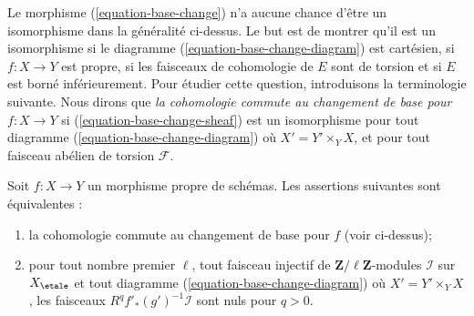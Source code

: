 \medskip\noindent
Le morphisme (\ref{equation-base-change}) n'a aucune chance d'être un isomorphisme
dans la généralité ci-dessus. Le but est de montrer
qu'il est un isomorphisme si le diagramme (\ref{equation-base-change-diagram})
est cartésien, si $f : X \to Y$ est propre, si les faisceaux de cohomologie de $E$
sont de torsion et si $E$ est borné inférieurement.
Pour étudier cette question, introduisons la terminologie suivante.
Nous dirons que {\it la cohomologie commute au changement de base
pour $f : X \to Y$} si (\ref{equation-base-change-sheaf})
est un isomorphisme pour tout diagramme (\ref{equation-base-change-diagram})
où $X' = Y' \times_Y X$, et pour tout faisceau abélien de torsion $\mathcal{F}$.

\begin{lemma}
\label{lemma-proper-base-change-in-terms-of-injectives}
Soit $f : X \to Y$ un morphisme propre de schémas.
Les assertions suivantes sont équivalentes :
\begin{enumerate}
\item la cohomologie commute au changement de base pour $f$ (voir ci-dessus);
\item pour tout nombre premier $\ell$, tout faisceau injectif
de $\mathbf{Z}/\ell\mathbf{Z}$-modules $\mathcal{I}$
sur $X_\etale$ et tout diagramme (\ref{equation-base-change-diagram})
où $X' = Y' \times_Y X$, les faisceaux
$R^qf'_*(g')^{-1}\mathcal{I}$ sont nuls pour $q > 0$.
\end{enumerate}
\end{lemma}

